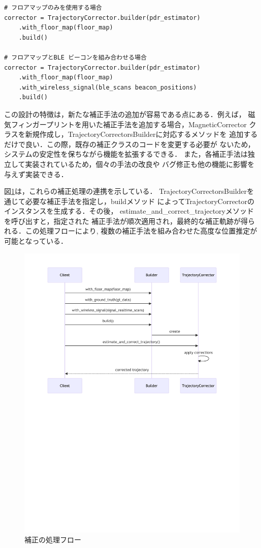 \begin{lstlisting}[caption={TrajectoryCorrectorの使用例},label=lst:trajectory-corrector,float=h]
# フロアマップのみを使用する場合
corrector = TrajectoryCorrector.builder(pdr_estimator)
    .with_floor_map(floor_map)
    .build()

# フロアマップとBLE ビーコンを組み合わせる場合
corrector = TrajectoryCorrector.builder(pdr_estimator)
    .with_floor_map(floor_map)
    .with_wireless_signal(ble_scans beacon_positions)
    .build()
\end{lstlisting}

この設計の特徴は，新たな補正手法の追加が容易である点にある．例えば，
磁気フィンガープリントを用いた補正手法を追加する場合，MagneticCorrector
クラスを新規作成し，TrajectoryCorrectorsBuilderに対応するメソッドを
追加するだけで良い．この際，既存の補正クラスのコードを変更する必要が
ないため，システムの安定性を保ちながら機能を拡張するできる．
また，各補正手法は独立して実装されているため，個々の手法の改良や
バグ修正も他の機能に影響を与えず実装できる．

図\ref{fig:corrector-sequence}は，これらの補正処理の連携を示している．
TrajectoryCorrectorsBuilderを通じて必要な補正手法を指定し，buildメソッド
によってTrajectoryCorrectorのインスタンスを生成する．その後，
estimate\_and\_correct\_trajectoryメソッドを呼び出すと，指定された
補正手法が順次適用され，最終的な補正軌跡が得られる．この処理フローにより,
複数の補正手法を組み合わせた高度な位置推定が可能となっている．


\begin{figure}[H]
    \centering
    \includegraphics[width=\linewidth]{../image/corrector-flow-diagram.pdf}
    \caption{補正の処理フロー}
    \label{fig:corrector-sequence}
\end{figure}
